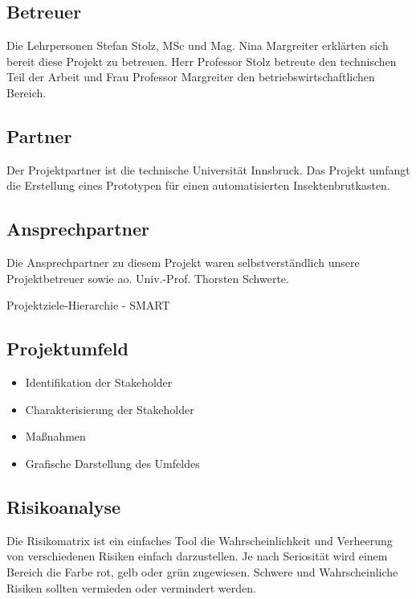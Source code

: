 \subsection{Betreuer}
Die Lehrpersonen Stefan Stolz, MSc und Mag. Nina Margreiter erklärten sich bereit diese Projekt zu betreuen. Herr Professor Stolz betreute den technischen Teil der Arbeit und Frau Professor Margreiter den betriebswirtschaftlichen Bereich.


\subsection{Partner}
Der Projektpartner ist die technische Universität Innsbruck. Das Projekt umfangt die Erstellung eines Prototypen für einen automatisierten Insektenbrutkasten.


\subsection{Ansprechpartner}
Die Ansprechpartner zu diesem Projekt waren selbstverständlich unsere Projektbetreuer sowie ao. Univ.-Prof. Thorsten Schwerte.



\newpage
\def \currentAuthor{Leonid Hammer}

Projektziele-Hierarchie - SMART

\subsection{Projektumfeld}
\begin{itemize}
	\item Identifikation der Stakeholder
	\item Charakterisierung der Stakeholder
	\item Maßnahmen
	\item Grafische Darstellung des Umfeldes
\end{itemize}

\newpage
\def \currentAuthor{Kevin Glatz}
\subsection{Risikoanalyse}

Die Risikomatrix ist ein einfaches Tool die Wahrscheinlichkeit und Verheerung von verschiedenen Risiken einfach darzustellen. Je nach Seriosität wird einem Bereich die Farbe rot, gelb oder grün zugewiesen. Schwere und Wahrscheinliche Risiken sollten vermieden oder vermindert werden. 

